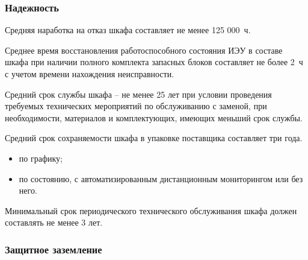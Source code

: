 \subsubsection{Надежность}

\begin{enumsubsub}
\item Средняя наработка на отказ шкафа составляет не менее 125 000~ч.
\item Среднее время восстановления работоспособного состояния ИЭУ в составе шкафа при наличии полного комплекта запасных блоков составляет не более 2~ч с учетом времени нахождения неисправности.
\item Средний срок службы шкафа -- не менее 25 лет при условии проведения требуемых технических мероприятий по обслуживанию с заменой, при необходимости, материалов и комплектующих, имеющих меньший срок службы.
\item Средний срок сохраняемости шкафа в упаковке поставщика составляет три года.
\item {}
  \begin{itemize}
  \item по графику;
  \item по состоянию, с автоматизированным дистанционным мониторингом или без него.
  \end{itemize}
\item Минимальный срок периодического технического обслуживания шкафа должен составлять не менее 3 лет.
\end{enumsubsub}

\subsubsection{Защитное заземление}

